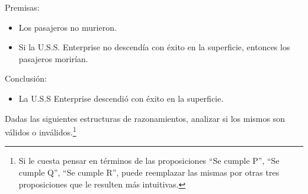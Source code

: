 \documentclass[12pt, addpoints]{../../common/epyl_exam_template}
\begin{document}
\begin{questions}
\begin{parts}
\begin{solution}
            Premisas:
            \begin{itemize}
              \item Los pasajeros no murieron.
              \item Si la U.S.S. Enterprise no descendía con éxito en la superficie,
                entonces los pasajeros morirían.
            \end{itemize}

            Conclusión:
            \begin{itemize}
              \item La U.S.S Enterprise descendió con éxito en la superficie.
            \end{itemize}
          \end{solution}
      \end{parts}

    \question
      Dadas las siguientes estructuras de razonamientos, analizar si los
      mismos son válidos o inválidos.\footnote{Si le cuesta pensar en términos
        de las proposiciones ``Se cumple P'', ``Se cumple Q'', ``Se cumple R'',
        puede reemplazar las mismas por otras tres proposiciones que le resulten
        más intuitivas.}

      \newcommand\secump[1]{\text{Se cumple #1}}

\end{questions}
\end{document}
